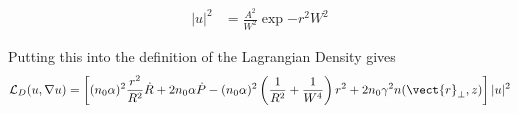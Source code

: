 \begin{equation}
    \begin{split}
    |u|^2 &= \frac{A^2}{W^2} \exp{-r^2 W^2}   
    \end{split}
\end{equation}


Putting this into the definition of the Lagrangian Density gives
\begin{equation}
    \begin{split}
    \mathcal{L}_{D}(u,\nabla u) &=   \left[ (n_0 \alpha)^2 \frac{r^2}{ R^2} \dot{R} + 2 n_0 \alpha \dot{P}    - (n_0 \alpha)^2 \left(\frac{1}{R^2} + \frac{1}{W^4}\right) r^2 + 2n_0 \gamma^2 n(\vect{r}_{\perp},z) \right] |u|^2 \\   
    \end{split}
\end{equation}

